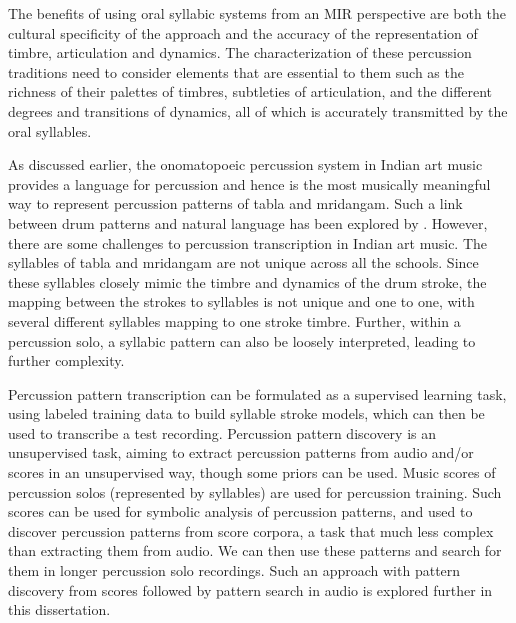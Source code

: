 The benefits of using oral syllabic systems from an \gls{MIR} perspective are both the cultural specificity of the approach and the accuracy of the representation of timbre, articulation and dynamics. The characterization of these percussion traditions need to consider elements that are essential to them such as the richness of their palettes of timbres, subtleties of articulation, and the different degrees and transitions of dynamics, all of which is accurately transmitted by the oral syllables. 

As discussed earlier, the onomatopoeic percussion system in Indian art music provides a language for percussion and hence is the most musically meaningful way to represent percussion patterns of \gls{tabla} and mridangam. Such a link between drum patterns and natural language has been explored by . However, there are some challenges to percussion transcription in Indian art music. The syllables of \gls{tabla} and mridangam are not unique across all the schools. Since these syllables closely mimic the timbre and dynamics of the drum stroke, the mapping between the strokes to syllables is not unique and one to one, with several different syllables mapping to one stroke timbre. Further, within a percussion solo, a syllabic pattern can also be loosely interpreted, leading to further complexity. 

Percussion pattern transcription can be formulated as a supervised learning task, using labeled training data to build syllable stroke models, which can then be used to transcribe a test recording. Percussion pattern discovery is an unsupervised task, aiming to extract percussion patterns from audio and/or scores in an unsupervised way, though some priors can be used. Music scores of percussion solos (represented by syllables) are used for percussion training. Such scores can be used for symbolic analysis of percussion patterns, and used to discover percussion patterns from score corpora, a task that much less complex than extracting them from audio. We can then use these patterns and search for them in longer percussion solo recordings. Such an approach with pattern discovery from scores followed by pattern search in audio is explored further in this dissertation. 

